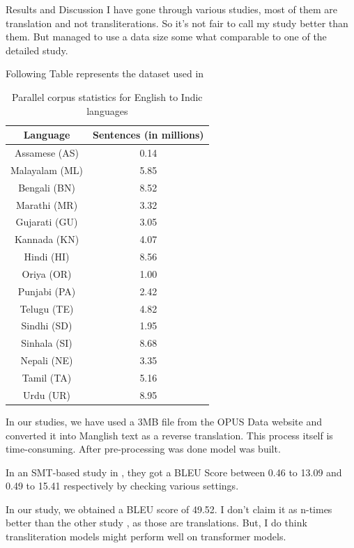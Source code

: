 \begin{chapter}{Results and Discussion}
    I have gone through various studies, most of them are translation and not transliterations. So it's not fair to call my study better than them. But managed to use a data size some what comparable to one of the detailed study.

\par Following Table represents the dataset used in \cite{statIndic}

\begin{table}[h]
\centering
\begin{tabular}{|c|c|}
\hline
Language & Sentences (in millions) \\
\hline
Assamese (AS) & 0.14 \\
Malayalam (ML) & 5.85 \\
Bengali (BN) & 8.52 \\
Marathi (MR) & 3.32 \\
Gujarati (GU) & 3.05 \\
Kannada (KN) & 4.07 \\
Hindi (HI) & 8.56 \\
Oriya (OR) & 1.00 \\
Punjabi (PA) & 2.42 \\
Telugu (TE) & 4.82 \\
Sindhi (SD) & 1.95 \\
Sinhala (SI) & 8.68 \\
Nepali (NE) & 3.35 \\
Tamil (TA) & 5.16 \\
Urdu (UR) & 8.95 \\
\hline
\end{tabular}
\caption{Parallel corpus statistics for English to Indic languages}
\label{tab:parallel-corpus}
\end{table}

In our studies, we have used a 3MB file from the OPUS Data website \cite{opusData} and converted it into Manglish text as a reverse translation. This process itself is time-consuming. After pre-processing was done model was built.

In an SMT-based study in \cite{statIndic}, they got a BLEU Score between 0.46 to 13.09 and 0.49 to 15.41 respectively by checking various settings.

In our study, we obtained a BLEU score of 49.52. I don't claim it as n-times better than the other study \cite{statIndic}, as those are translations. But, I do think transliteration models might perform well on transformer models.


\end{chapter}
